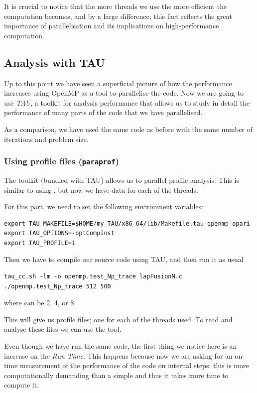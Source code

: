 It is crucial to notice that the more threads we use the more efficient the computation becomes, and by a large difference; this fact reflects the great importance of parallelisation and its implications on high-performance computation.

\subsection{Analysis with TAU}

Up to this point we have seen a superficial picture of how the performance increases using OpenMP as a tool to parallelise the code. Now we are going to use \emph{TAU}, a toolkit for analysis performance that allows us to study in detail the performance of many parts of the code that we have parallelised.

As a comparison, we have used the same code as before with the same number of iterations and problem size.

\subsubsection{Using profile files (\texttt{paraprof})}

The toolkit  (bundled with TAU) allows us to parallel profile analysis. This is similar to using , but now we have data for each of the threads.

For this part, we need to set the following environment variables:
\begin{lstlisting}
export TAU_MAKEFILE=$HOME/my_TAU/x86_64/lib/Makefile.tau-openmp-opari
export TAU_OPTIONS=-optCompInst
export TAU_PROFILE=1
\end{lstlisting}

Then we have to compile our source code using TAU, and then run it as usual
\begin{lstlisting}
tau_cc.sh -lm -o openmp.test_Np_trace lapFusionN.c
./openmp.test_Np_trace 512 500
\end{lstlisting}
where  can be 2, 4, or 8.

This will give us  profile files; one for each of the threads used. To read and analyse these files we can use the  tool.

\bigskip
Even though we have run the same code, the first thing we notice here is an increase on the \emph{Run Time}. This happens because now we are asking for an on-time measurement of the performance of the code on internal steps; this is more computationally demanding than a simple  and thus it takes more time to compute it.

